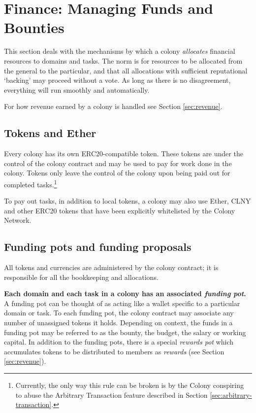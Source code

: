 

\section{Finance: Managing Funds and Bounties}\label{sec:finance}
This section deals with the mechanisms by which a colony \emph{allocates} financial resources to domains and tasks. The norm is for resources to be allocated from the general to the particular, and that all allocations with sufficient reputational `backing' may proceed without a vote. As long as there is no disagreement, everything will run smoothly and automatically.

For how revenue earned by a colony is handled see Section \ref{sec:revenue}.

\subsection{Tokens and Ether}
Every colony has its own ERC20-compatible token. These tokens are under the control of the colony contract and may be used to pay for work done in the colony. Tokens only leave the control of the colony upon being paid out for completed tasks.\footnote{Currently, the only way this rule can be broken is by the Colony conspiring to abuse the Arbitrary Transaction feature described in Section \ref{sec:arbitrary-transaction}. }

To pay out tasks, in addition to local tokens, a colony may also use Ether, CLNY and other ERC20 tokens that have been explicitly whitelisted by the Colony Network.


\subsection{Funding pots and funding proposals}\label{sec:pots-and-fp}
All tokens and currencies are administered by the colony contract; it is responsible for all the bookkeeping and allocations.

\textbf{Each domain and each task in a colony has an associated \emph{funding pot}.} A funding pot can be thought of as acting like a wallet specific to a particular domain or task. To each funding pot, the colony contract may associate any number of unassigned tokens it holds. Depending on context, the funds in a funding pot may be referred to as the bounty, the budget, the salary or working capital. In addition to the funding pots, there is a special \emph{rewards pot} which accumulates tokens to be distributed to members as \textit{rewards} (see Section \ref{sec:revenue}).

